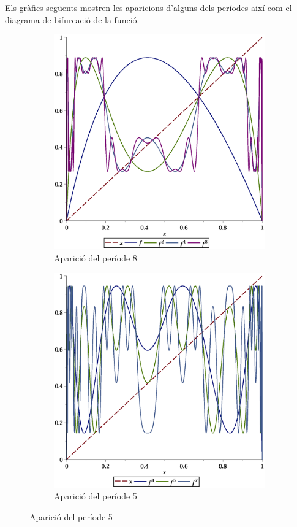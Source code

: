 \documentclass[a4paper]{article}
\theoremstyle{definition}
\begin{document}
Els gràfics següents mostren les aparicions d'alguns dels períodes així com el diagrama de bifurcació de la funció.
\begin{figure}[ht]
  \begin{subfigure}[ht]{0.45\linewidth}
    \centering
    \includegraphics[width=\linewidth]{Images/map22.eps}
    \caption{Aparició del període 8}
  \end{subfigure}
  \hfill
  \begin{subfigure}[ht]{0.45\linewidth}
    \centering
    \includegraphics[width=\linewidth]{Images/map25.eps}
    \caption{Aparició del període 5}
  \end{subfigure}
\end{figure}
\end{document}
